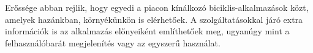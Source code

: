  \par	Erőssége abban rejlik, hogy egyedi a piacon kínálkozó biciklis-alkalmazások közt, amelyek hazánkban, környékünkön is elérhetőek. A szolgáltatásokkal járó extra információk is az alkalmazás előnyeiként említhetőek meg, ugyanúgy mint a felhasználóbarát megjelenítés vagy az egyszerű használat. 

